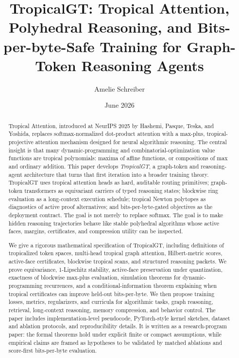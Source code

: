 \documentclass[11pt]{article}
\title{\vspace{-2em}\textbf{TropicalGT: Tropical Attention, Polyhedral Reasoning, and Bits-per-byte-Safe Training for Graph-Token Reasoning Agents}}
\author{Amelie Schreiber}
\date{June 2026}
\begin{document}
\maketitle

\begin{abstract}
Tropical Attention, introduced at NeurIPS 2025 by Hashemi, Pasque, Teska, and Yoshida, replaces softmax-normalized dot-product attention with a max-plus, tropical-projective attention mechanism designed for neural algorithmic reasoning.  The central insight is that many dynamic-programming and combinatorial-optimization value functions are tropical polynomials: maxima of affine functions, or compositions of max and ordinary addition.  This paper develops \emph{TropicalGT}, a graph-token and reasoning-agent architecture that turns that first iteration into a broader training theory.  TropicalGT uses tropical attention heads as hard, auditable routing primitives; graph-token transformers as equivariant carriers of typed reasoning states; blockwise ring evaluation as a long-context execution schedule; tropical Newton polytopes as diagnostics of active proof alternatives; and bits-per-byte-gated objectives as the deployment contract.  The goal is not merely to replace softmax.  The goal is to make hidden reasoning trajectories behave like stable polyhedral algorithms whose active faces, margins, certificates, and compression utility can be inspected.

We give a rigorous mathematical specification of TropicalGT, including definitions of tropicalized token spaces, multi-head tropical graph attention, Hilbert-metric scores, active-face certificates, blockwise tropical scans, and structured reasoning packets.  We prove equivariance, 1-Lipschitz stability, active-face preservation under quantization, exactness of blockwise max-plus evaluation, simulation theorems for dynamic-programming recurrences, and a conditional-information theorem explaining when tropical certificates can improve held-out bits-per-byte.  We then propose training losses, metrics, regularizers, and curricula for algorithmic tasks, graph reasoning, retrieval, long-context reasoning, memory compression, and behavior control.  The paper includes implementation-level pseudocode, PyTorch-style kernel sketches, dataset and ablation protocols, and reproducibility details.  It is written as a research-program paper: the formal theorems hold under explicit finite or compact assumptions, while empirical claims are framed as hypotheses to be validated by matched ablations and score-first bits-per-byte evaluation.
\end{abstract}
\end{document}
